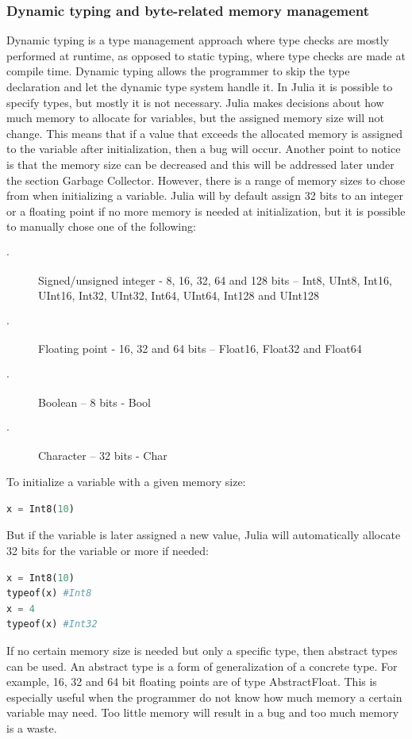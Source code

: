 \documentclass[a4paper, 11pt, titlepage]{article}
\begin{document}
\subsubsection{Dynamic typing and byte-related memory management}
Dynamic typing is a type management approach where type checks are mostly performed at runtime, as opposed to static typing, where type checks are made at compile time. Dynamic typing allows the programmer to skip the type declaration and let the dynamic type system handle it. In Julia it is possible to specify types, but mostly it is not necessary. 
Julia makes decisions about how much memory to allocate for variables, but the assigned memory size will not change. This means that if a value that exceeds the allocated memory is assigned to the variable after initialization, then a bug will occur. Another point to notice is that the memory size can be decreased and this will be addressed later under the section Garbage Collector. However, there is a range of memory sizes to chose from when initializing a variable. Julia will by default assign 32 bits to an integer or a floating point if no more memory is needed at initialization, but it is possible to manually chose one of the following:
\begin{description}
	\item[$\cdot$] Signed/unsigned integer - 8, 16, 32, 64 and 128 bits – Int8, UInt8, Int16, UInt16, Int32, UInt32, Int64, UInt64, Int128 and UInt128
	\item[$\cdot$] Floating point - 16, 32 and 64 bits – Float16, Float32 and Float64
	\item[$\cdot$] Boolean – 8 bits - Bool
	\item[$\cdot$] Character – 32 bits - Char
\end{description}
To initialize a variable with a given memory size:
\begin{lstlisting}[language=python]
x = Int8(10)
\end{lstlisting}
But if the variable is later assigned a new value, Julia will automatically allocate 32 bits for the variable or more if needed:
\begin{lstlisting}[language=python]
x = Int8(10)
typeof(x) #Int8
x = 4
typeof(x) #Int32
\end{lstlisting}
If no certain memory size is needed but only a specific type, then abstract types can be used. An abstract type is a form of generalization of a concrete type. For example, 16, 32 and 64 bit floating points are of type AbstractFloat. This is especially useful when the programmer do not know how much memory a certain variable may need. Too little memory will result in a bug and too much memory is a waste. 
\end{document}
